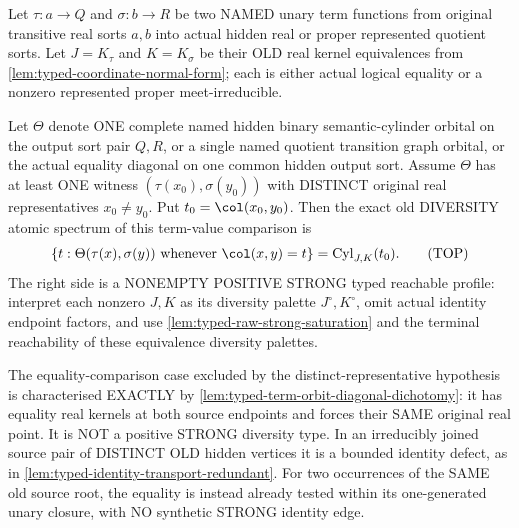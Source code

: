 \begin{lemma}
\label{lem:typed-term-pair-orbit-pullback}
Let \(\tau:a\to Q\) and
\(\sigma:b\to R\) be two
NAMED unary term functions
from original transitive
real sorts \(a,b\) into
actual hidden real or
proper represented quotient
sorts. Let \(J=K_\tau\)
and \(K=K_\sigma\) be their
OLD real kernel
equivalences from
\cref{lem:typed-coordinate-normal-form};
each is either actual
logical equality or a
nonzero represented proper
meet-irreducible.

Let \(\Theta\) denote ONE
complete named hidden
binary semantic-cylinder
orbital on the output
sort pair \(Q,R\), or a
single named quotient
transition graph orbital,
or the actual equality
diagonal on one common
hidden output sort.
Assume \(\Theta\) has at
least ONE witness
\((\tau(x_0),\sigma(y_0))\)
with DISTINCT original
real representatives
\(x_0\ne y_0\).
Put \(t_0=\col(x_0,y_0)\).
Then the exact old
DIVERSITY atomic spectrum
of this term-value
comparison is
\[
 \{t:\Theta(\tau(x),\sigma(y))
       \text{ whenever }\col(x,y)=t\}
     =\operatorname{Cyl}_{J,K}(t_0).
\tag{TOP}\label{eq:typed-term-orbital-pullback}
\]
The right side is a
NONEMPTY POSITIVE STRONG
typed reachable profile:
interpret each nonzero
\(J,K\) as its diversity
palette \(J^\circ,K^\circ\),
omit actual identity
endpoint factors, and use
\cref{lem:typed-raw-strong-saturation}
and the terminal reachability
of these equivalence
diversity palettes.

The equality-comparison
case excluded by the
distinct-representative
hypothesis is characterised
EXACTLY by
\cref{lem:typed-term-orbit-diagonal-dichotomy}:
it has equality real
kernels at both source
endpoints and forces their
SAME original real point.
It is NOT a positive
STRONG diversity type. In an irreducibly
joined source pair of
DISTINCT OLD hidden
vertices it is a bounded
identity defect, as in
\cref{lem:typed-identity-transport-redundant}.
For two occurrences of
the SAME old source root,
the equality is instead
already tested within its
one-generated unary
closure, with NO synthetic
STRONG identity edge.
\end{lemma}
